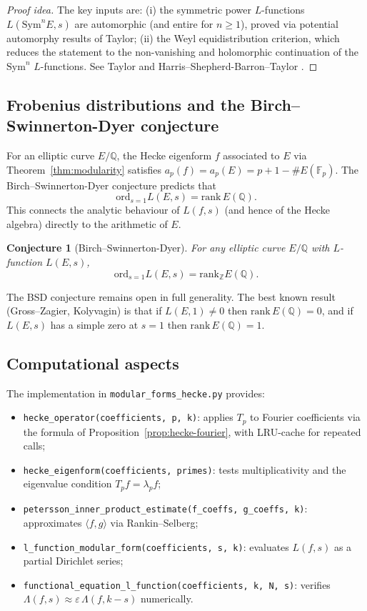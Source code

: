 \documentclass[12pt,a4paper]{amsart}
\newtheorem{conjecture}[theorem]{Conjecture}
\theoremstyle{definition}
\begin{document}
\begin{proof}[Proof idea]
  The key inputs are: (i) the symmetric power $L$-functions $L(\mathrm{Sym}^n E, s)$
  are automorphic (and entire for $n \ge 1$), proved via potential automorphy
  results of Taylor; (ii) the Weyl equidistribution criterion, which reduces the
  statement to the non-vanishing and holomorphic continuation of the
  $\mathrm{Sym}^n$ $L$-functions. See Taylor \cite{Taylor} and Harris--Shepherd-Barron--Taylor \cite{HST}.
\end{proof}

\subsection{Frobenius distributions and the Birch--Swinnerton-Dyer conjecture}

For an elliptic curve $E/\mathbb{Q}$, the Hecke eigenform $f$ associated to $E$
via Theorem~\ref{thm:modularity} satisfies $a_p(f) = a_p(E) = p+1-\#E(\mathbb{F}_p)$.
The Birch--Swinnerton-Dyer conjecture predicts that
\[
  \mathrm{ord}_{s=1} L(E,s) = \mathrm{rank}\, E(\mathbb{Q}).
\]
This connects the analytic behaviour of $L(f,s)$ (and hence of the Hecke
algebra) directly to the arithmetic of $E$.

\begin{conjecture}[Birch--Swinnerton-Dyer]\label{conj:bsd}
  For any elliptic curve $E/\mathbb{Q}$ with $L$-function $L(E,s)$,
  \[
    \mathrm{ord}_{s=1} L(E,s) = \mathrm{rank}_{\mathbb{Z}} E(\mathbb{Q}).
  \]
\end{conjecture}

The BSD conjecture remains open in full generality. The best known result
(Gross--Zagier, Kolyvagin) is that if $L(E,1) \ne 0$ then $\mathrm{rank}\, E(\mathbb{Q}) = 0$,
and if $L(E,s)$ has a simple zero at $s=1$ then $\mathrm{rank}\, E(\mathbb{Q}) = 1$.

\subsection{Computational aspects}

The implementation in \texttt{modular\_forms\_hecke.py} provides:
\begin{itemize}
  \item \texttt{hecke\_operator(coefficients, p, k)}: applies $T_p$ to Fourier
        coefficients via the formula of Proposition~\ref{prop:hecke-fourier},
        with LRU-cache for repeated calls;
  \item \texttt{hecke\_eigenform(coefficients, primes)}: tests multiplicativity
        and the eigenvalue condition $T_p f = \lambda_p f$;
  \item \texttt{petersson\_inner\_product\_estimate(f\_coeffs, g\_coeffs, k)}:
        approximates $\langle f, g \rangle$ via Rankin--Selberg;
  \item \texttt{l\_function\_modular\_form(coefficients, s, k)}: evaluates
        $L(f,s)$ as a partial Dirichlet series;
  \item \texttt{functional\_equation\_l\_function(coefficients, k, N, s)}: verifies
        $\Lambda(f,s) \approx \varepsilon\,\Lambda(f,k-s)$ numerically.
\end{itemize}
\end{document}

